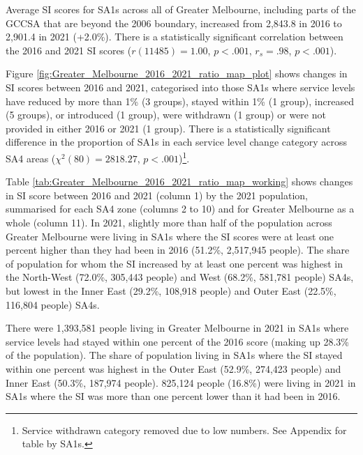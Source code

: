 \documentclass[preprint, 3p,
authoryear]{elsarticle} %
\begin{document}
Average SI scores for SA1s across all of Greater Melbourne, including
parts of the GCCSA that are beyond the 2006 boundary, increased from
2,843.8 in 2016 to 2,901.4 in 2021 (+2.0\%). There is a statistically
significant correlation between the 2016 and 2021 SI scores
(\(r(11485) = 1.00\), \(p < .001\), \(r_s =.98\), \(p < .001\)).

Figure \ref{fig:Greater_Melbourne_2016_2021_ratio_map_plot} shows
changes in SI scores between 2016 and 2021, categorised into those SA1s
where service levels have reduced by more than 1\% (3 groups), stayed
within 1\% (1 group), increased (5 groups), or introduced (1 group),
were withdrawn (1 group) or were not provided in either 2016 or 2021 (1
group). There is a statistically significant difference in the
proportion of SA1s in each service level change category across SA4
areas (\(\chi^2(80) = 2818.27\), \(p < .001\))\footnote{Service
  withdrawn category removed due to low numbers. See Appendix for table
  by SA1s.}.

Table \ref{tab:Greater_Melbourne_2016_2021_ratio_map_working} shows
changes in SI score between 2016 and 2021 (column 1) by the 2021
population, summarised for each SA4 zone (columns 2 to 10) and for
Greater Melbourne as a whole (column 11). In 2021, slightly more than
half of the population across Greater Melbourne were living in SA1s
where the SI scores were at least one percent higher than they had been
in 2016 (51.2\%, 2,517,945 people). The share of population for whom the
SI increased by at least one percent was highest in the North-West
(72.0\%, 305,443 people) and West (68.2\%, 581,781 people) SA4s, but
lowest in the Inner East (29.2\%, 108,918 people) and Outer East
(22.5\%, 116,804 people) SA4s.

There were 1,393,581 people living in Greater Melbourne in 2021 in SA1s
where service levels had stayed within one percent of the 2016 score
(making up 28.3\% of the population). The share of population living in
SA1s where the SI stayed within one percent was highest in the Outer
East (52.9\%, 274,423 people) and Inner East (50.3\%, 187,974 people).
825,124 people (16.8\%) were living in 2021 in SA1s where the SI was
more than one percent lower than it had been in 2016.
\end{document}
